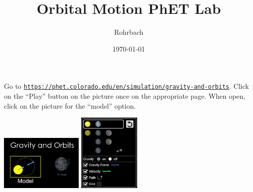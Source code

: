 \documentclass[10pt]{exam}
\title{Orbital Motion PhET Lab}
\author{Rohrbach}
\date{\today}
\begin{document}
\maketitle

\noindent
Go to \href{https://phet.colorado.edu/en/simulation/gravity-and-orbits}{\texttt{https://phet.colorado.edu/en/simulation/gravity-and-orbits}}.  Click on the “Play” button on the picture once on the appropriate page.  When open, click on the picture for the “model” option.

\includegraphics[width=4cm]{model.png} \hfill \includegraphics[width=3cm]{settings.png}
\end{document}
